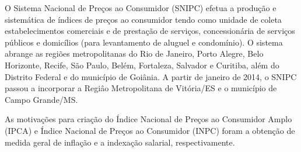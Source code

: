 \documentclass[twoside,a4paper,11pt]{report}
\begin{document}
O Sistema Nacional de Preços ao Consumidor (SNIPC) efetua a produção e sistemática de índices de preços ao consumidor tendo como unidade de coleta estabelecimentos comerciais e de prestação de serviços, concessionária de serviços públicos e domicílios (para levantamento de aluguel e condomínio). O sistema abrange as regiões metropolitanas do Rio de Janeiro, Porto Alegre, Belo Horizonte, Recife, São Paulo, Belém, Fortaleza, Salvador e Curitiba, além do Distrito Federal e do município de Goiânia. A partir de janeiro de 2014, o SNIPC passou a incorporar a Regiâo Metropolitana de Vitória/ES e o município de Campo Grande/MS. 

As motivações para criação do Índice Nacional de Preços ao Consumidor Amplo (IPCA) e Índice Nacional de Preços ao Consumidor (INPC) foram a obtenção de medida geral de inflação e a indexação salarial, respectivamente.

% 
% 
\end{document}
